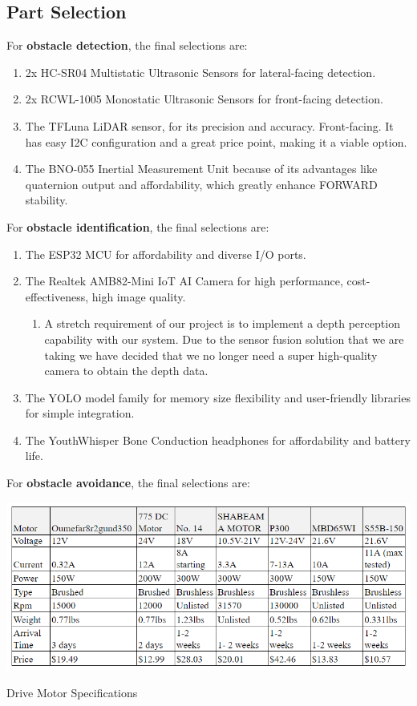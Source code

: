 \subsection{Part Selection}
\noindent For \textbf{obstacle detection}, the final selections are:
\begin{enumerate}
	\item 2x HC-SR04 Multistatic Ultrasonic Sensors for lateral-facing detection.
	\item 2x RCWL-1005 Monostatic Ultrasonic Sensors for front-facing detection.
	\item The TFLuna LiDAR sensor, for its precision and accuracy. Front-facing. It has easy I2C configuration and a great price point, making it a viable option.
	\item The BNO-055 Inertial Measurement Unit because of its advantages like quaternion output and affordability, which greatly enhance FORWARD stability.
\end{enumerate}

\noindent For \textbf{obstacle identification}, the final selections are:
\begin{enumerate}
	\item The ESP32 MCU for affordability and diverse I/O ports. 
	\item The Realtek AMB82-Mini IoT AI Camera for high performance, cost-effectiveness, high image quality.
	\begin{enumerate}
		\item A stretch requirement of our project is to implement a depth perception capability with our system. Due to the sensor fusion solution that we are taking we have decided that we no longer need a super high-quality camera to obtain the depth data.
	\end{enumerate}
	\item The YOLO model family for memory size flexibility and user-friendly libraries for simple integration.
	\item The YouthWhisper Bone Conduction headphones for affordability and battery life.
\end{enumerate}


\noindent For \textbf{obstacle avoidance}, the final selections are:
\begin{table}[H]
	\centering
	\includegraphics[width=1\textwidth]{./Images/drive_motors.png}
	\caption{\label{fig:drive_motors}Drive Motor Specifications}
\end{table}


